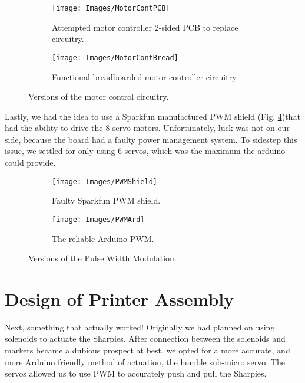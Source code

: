 \documentclass[11pt, oneside]{article}
\begin{document}
\begin{figure}[H]
    \centering
    \begin{subfigure}[b]{0.35\textwidth}
        \texttt{[image: Images/MotorContPCB]}
        \caption{Attempted motor controller 2-sided PCB to replace circuitry.}
        \label{fig:MotorContPCB}
    \end{subfigure}
    \begin{subfigure}[b]{0.35\textwidth}
        \texttt{[image: Images/MotorContBread]}
        \caption[center]{Functional breadboarded motor controller circuitry.}
        \label{fig:MotorContBread}
    \end{subfigure}
    \caption{Versions of the motor control circuitry.}
    \label{fig:MotorCont}
\end{figure}

Lastly, we had the idea to use a Sparkfun manufactured PWM shield (Fig. \ref{fig:PWMShield})that had the ability to drive the 8 servo motors. Unfortunately, luck was not on our side, because the board had a faulty power management system. To sidestep this issue, we settled for only using 6 servos, which was the maximum the arduino could provide.
\begin{figure}[H]
    \centering
    \begin{subfigure}[b]{0.35\textwidth}
        \texttt{[image: Images/PWMShield]}
        \caption{Faulty Sparkfun PWM shield.}
        \label{fig:PWMShield}
    \end{subfigure}
    \begin{subfigure}[b]{0.35\textwidth}
        \texttt{[image: Images/PWMArd]}
        \caption[center]{The reliable Arduino PWM.}
        \label{fig:PWMArd}
    \end{subfigure}
    \caption{Versions of the Pulse Width Modulation.}
    \label{fig:PWM}
\end{figure}
\section{Design of Printer Assembly}
Next, something that actually worked! Originally we had planned on using solenoids to actuate the Sharpies. After connection between the solenoids and markers became a  dubious prospect at best, we opted for a more accurate, and more Arduino friendly method of actuation, the humble sub-micro servo. The servos allowed us to use PWM to accurately push and pull the Sharpies.
\end{document}
